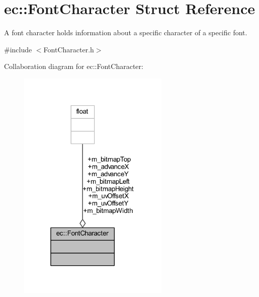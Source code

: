 \hypertarget{structec_1_1_font_character}{}\section{ec\+:\+:Font\+Character Struct Reference}
\label{structec_1_1_font_character}


A font character holds information about a specific character of a specific font.  




{\ttfamily \#include $<$Font\+Character.\+h$>$}



Collaboration diagram for ec\+:\+:Font\+Character\+:\nopagebreak
\begin{figure}[H]
\begin{center}
\leavevmode
\includegraphics[width=205pt]{structec_1_1_font_character__coll__graph}
\end{center}
\end{figure}
